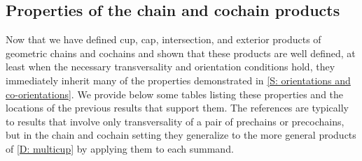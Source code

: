 \begin{comment}
	\begin{proof}
		If $\uV,\uW \in C^*_\Gamma(N)$ are represented by $f \colon V \to N$ and $g \colon W \to N$ that are transverse to $h$, then $\uV+\uW$ is represented by $V \sqcup W$, which will also be transverse to $h$.
		So $C^*_{\Gamma \pf h}(N)$ is closed under addition.
		If $f \colon V \to N$ is transverse to $h$ then so is $-f$, i.e.\ $f$ with the opposite co-orientation, so $C^*_{\Gamma \pf h}(N)$ is closed under taking negatives.
		The empty map $\emptyset \to N$ is always transverse to $h$ (since there are no points at which to check the tangent space condition), and so $0 \in C^*_{\Gamma \pf h}(N)$.
		Finally, if $\uV$ is represented by $f \colon V \to N$ transverse to $h$, then by definition $\bd V \to N$ is transverse to $h$, so $\bd \uV \in C^*_{\Gamma \pf h}(N)$.
		Therefore, $C^*_{\Gamma \pf h}(N)$, is a subcomplex of $C^*_{\Gamma}(N)$.

		To how that $h^*$ is well defined on $C^*_{\Gamma \pf h}(N)$ we must show that it does not depend on the choice of representative $V$.
		Suppose $V$ and $V'$ both represent $\uV$ and are transverse to $h$.
		Then $V \sqcup -V'$ is transverse to $h$ and an element of $Q^*(N)$.
		So by \cref{L: pullback map Q}, $h^*(V \sqcup -V')$, which is by definition $(V \sqcup -V') \times_N M = (V \times_N M) \sqcup (-V' \times_N M)$ mapping to $M$, is an element of $Q^*(M)$.
		So $h^*(V)$ and $h^*(V')$ represent the same element of $C^*_{\Gamma}(M)$.
		Thus $h^*$ is well defined.

		To see that $h^*$ is a homomorphism, let $V,W \to N$ represent elements of $C^*_{\Gamma}(N)$ that are transverse to $h$.
		Then
		$$h^*(\uV+\uW) = \underline{h^*(V \sqcup W)} = \underline{h^*(V) \sqcup h^*(W)} = \underline{h^*(V)}+\underline{h^*(W)},$$
		using the definitions, obvious properties of the pullback and \cref{L: co/chains well defined}.
		Furthermore, $h^*$ is a chain map by \cref{leibniz}, as $\bd M = \emptyset$.
	\end{proof}
\end{comment}


\subsection{Properties of the chain and cochain products}\label{S: (co)chain properties}

Now that we have defined cup, cap, intersection, and exterior products of geometric chains and cochains and shown that these products are well defined, at least when the necessary transversality and orientation conditions hold, they immediately inherit many of the properties demonstrated in \cref{S: orientations and co-orientations}.
We provide below some tables listing these properties and the locations of the previous results that support them.
The references are typically to results that involve only transversality of a pair of prechains or precochains, but in the chain and cochain setting they generalize to the more general products of \cref{D: multicup} by applying them to each summand.

